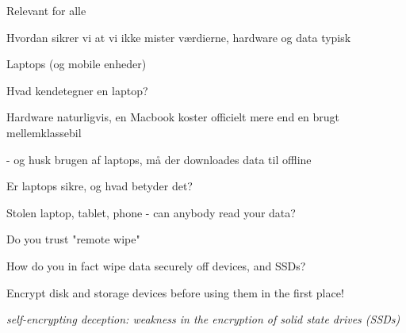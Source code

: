 \documentclass[Screen16to9,17pt]{foils}
\begin{document}
\begin{list2}
\item Relevant for alle
\item Hvordan sikrer vi at vi ikke mister værdierne, hardware og data typisk
\end{list2}




\begin{list2}
\item Laptops (og mobile enheder)
\item Hvad kendetegner en laptop?
\item Hardware naturligvis, en Macbook koster officielt mere end en brugt mellemklassebil
\item - og husk brugen af laptops, må der downloades data til offline
\item Er laptops sikre, og hvad betyder det?
\end{list2}





\begin{list1}
\item Stolen laptop, tablet, phone - can anybody read your data?
\item Do you trust "remote wipe"
\item How do you in fact wipe data securely off devices, and SSDs?
\item Encrypt disk and storage devices before using them in the first place!
\end{list1}


\emph{self-encrypting deception: weakness in the encryption of solid state drives (SSDs)}\\





\end{document}
